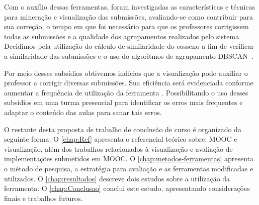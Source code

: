 	Com o auxílio dessas ferramentas, foram investigadas as características e técnicas
	para mineração e visualização das submissões, avaliando-se como contribuir para sua
	correção, o tempo em que foi necessário para que os professores corrigissem todas
	as submissões e a qualidade dos agrupamentos realizados pelo sistema. Decidimos pela
	utilização do cálculo de similaridade do cosseno a fim de verificar a similaridade
	das submissões e o uso do algoritmos de agrupamento \acs{DBSCAN}~\cite{Ester1996}.
	
	Por meio desses subsídios obtivemos indícios que a visualização pode auxiliar o
	professor a corrigir diversas submissões. Sua eficiência será evidenciada conforme
	aumentar a frequência de utilização da ferramenta . Possibilitando
	o uso desses subsídios em uma turma presencial para identificar os erros mais
	frequentes e adaptar o conteúdo das aulas para sanar tais erros.
	
	O restante desta proposta de trabalho de conclusão de curso é organizado da seguinte
	forma. O \cref{chap:Ref} apresenta o referencial teórico sobre: \acs{MOOC} e visualização,
	além dos trabalhos relacionados à visualização e avaliação de implementações submetidos
	em \acs{MOOC}. O \cref{chap:metodos-ferramentas} apresenta o método de pesquisa, a estratégia
	para avaliação e as ferramentas modificadas e utilizados. O \cref{chap:resultados} descreve
	dois estudos sobre a utilização da ferramenta. O
	\cref{chap:Conclusao} conclui este estudo, apresentando considerações finais e trabalhos
	futuros.
